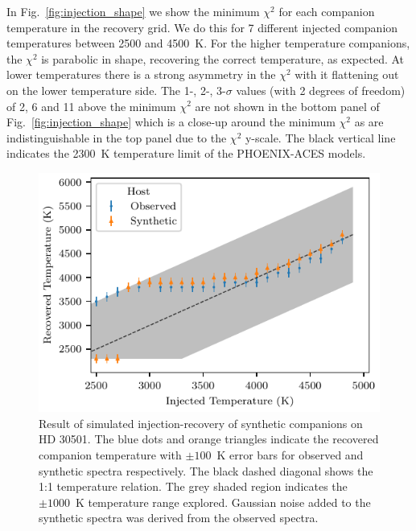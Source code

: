 \documentclass[fleqn,usenatbib]{mnras}
\begin{document}
In Fig.~\ref{fig:injection_shape} we show the minimum \(\chi^2\) for each companion temperature in the recovery grid. We do this for 7 different injected companion temperatures between 2500 and 4500~K. For the higher temperature companions, the \(\chi^2\) is parabolic in shape, recovering the correct temperature, as expected. At lower temperatures there is a strong asymmetry in the \(\chi^2\) with it flattening out on the lower temperature side. 
The 1-, 2-, 3-\(\sigma\) values (with 2 degrees of freedom) of 2, 6 and 11 above the minimum \(\chi^2\) are not shown in the bottom panel of Fig.~\ref{fig:injection_shape} which is a close-up around the minimum \(\chi^2\) as are indistinguishable in the top panel due to the \(\chi^2\) y-scale. The black vertical line indicates the 2300~K temperature limit of the PHOENIX-ACES models.


\begin{figure}
    \centering
    \includegraphics[width=\hsize]{images/inject_recovery_hd30501.pdf}
    \caption{Result of simulated injection-recovery of synthetic companions on {HD 30501}. The blue dots and orange triangles indicate the recovered companion temperature with \(\pm100\)~K error bars for observed and synthetic spectra respectively. The black dashed diagonal shows the 1:1 temperature relation. The grey shaded region indicates the \(\pm1000\)~K temperature range explored. Gaussian noise added to the synthetic spectra was derived from the observed spectra.}
    \label{fig:injection-recovery}
\end{figure}
\end{document}
